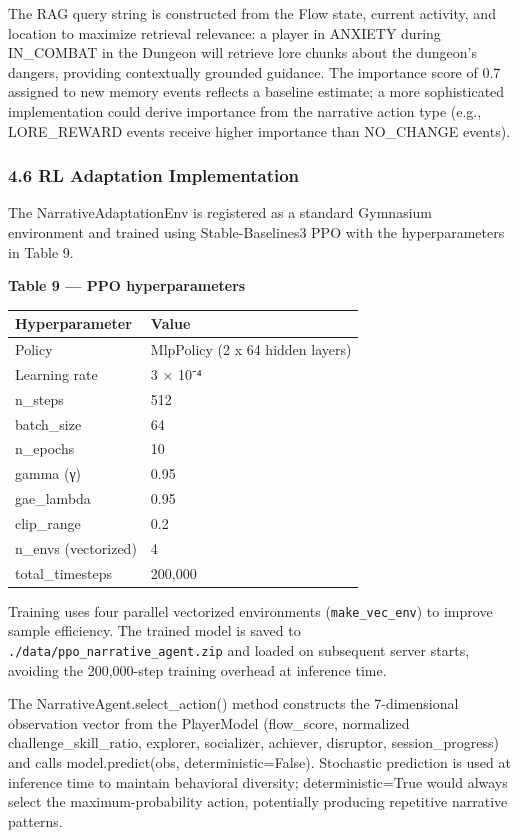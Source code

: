 The RAG query string is constructed from the Flow state, current
activity, and location to maximize retrieval relevance: a player in
ANXIETY during IN\_COMBAT in the Dungeon will retrieve lore chunks about
the dungeon's dangers, providing contextually grounded guidance. The
importance score of 0.7 assigned to new memory events reflects a
baseline estimate; a more sophisticated implementation could derive
importance from the narrative action type (e.g., LORE\_REWARD events
receive higher importance than NO\_CHANGE events).

\subsubsection{4.6 RL Adaptation
Implementation}\label{rl-adaptation-implementation}

The NarrativeAdaptationEnv is registered as a standard Gymnasium
environment and trained using Stable-Baselines3 PPO with the
hyperparameters in Table 9.

\textbf{Table 9 --- PPO hyperparameters}

\begin{longtable}[]{@{}ll@{}}
\toprule\noalign{}
Hyperparameter & Value \\
\midrule\noalign{}
\endhead
\bottomrule\noalign{}
\endlastfoot
Policy & MlpPolicy (2 x 64 hidden layers) \\
Learning rate & 3 × 10⁻⁴ \\
n\_steps & 512 \\
batch\_size & 64 \\
n\_epochs & 10 \\
gamma (γ) & 0.95 \\
gae\_lambda & 0.95 \\
clip\_range & 0.2 \\
n\_envs (vectorized) & 4 \\
total\_timesteps & 200,000 \\
\end{longtable}

Training uses four parallel vectorized environments
(\texttt{make\_vec\_env}) to improve sample efficiency. The trained
model is saved to \texttt{./data/ppo\_narrative\_agent.zip} and loaded
on subsequent server starts, avoiding the 200,000-step training overhead
at inference time.

The NarrativeAgent.select\_action() method constructs the 7-dimensional
observation vector from the PlayerModel (flow\_score, normalized
challenge\_skill\_ratio, explorer, socializer, achiever, disruptor,
session\_progress) and calls model.predict(obs, deterministic=False).
Stochastic prediction is used at inference time to maintain behavioral
diversity; deterministic=True would always select the
maximum-probability action, potentially producing repetitive narrative
patterns.

